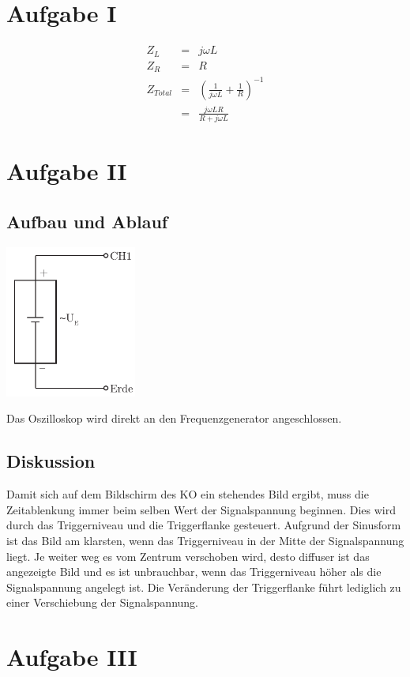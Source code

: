 \documentclass[12pt,a4paper]{article}
\begin{document}
\section*{Aufgabe I}
\begin{eqnarray*}
Z_L & = & j \omega L \\
Z_R & = & R \\
Z_{Total} & = & \left( \frac{1}{j \omega L} + \frac{1}{R} \right) ^{-1} \\
& = & \frac{j \omega L R}{R + j \omega L}
\end{eqnarray*}


\section*{Aufgabe II}
\subsection*{Aufbau und Ablauf}
\includegraphics[height=5cm]{illustration2.pdf}

Das Oszilloskop wird direkt an den Frequenzgenerator angeschlossen.

\subsection*{Diskussion}
Damit sich auf dem Bildschirm des KO ein stehendes Bild ergibt, muss die Zeitablenkung immer beim selben Wert der Signalspannung beginnen. Dies wird durch das Triggerniveau und die Triggerflanke gesteuert.
Aufgrund der Sinusform ist das Bild am klarsten, wenn das Triggerniveau in der Mitte der Signalspannung liegt. Je weiter weg es vom Zentrum verschoben wird, desto diffuser ist das angezeigte Bild und es ist unbrauchbar, wenn das Triggerniveau h\"oher als die Signalspannung angelegt ist.
Die Ver\"anderung der Triggerflanke f\"uhrt lediglich zu einer Verschiebung der Signalspannung.


\section*{Aufgabe III}
\end{document}
